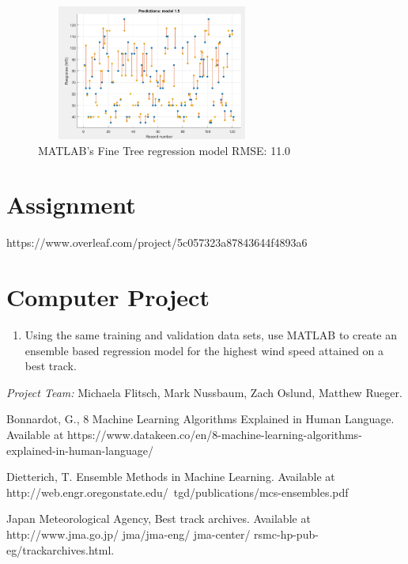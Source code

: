 \documentclass{SBCbookchapter}
\begin{document}
 \begin{figure}[!htpb]
 \centering
\includegraphics[width=3in,height=1.75in]{TyphoonCM2.png}
\caption{MATLAB's Fine Tree regression model RMSE: 11.0 }
\label{fig2}
\end{figure}

\section{Assignment}https://www.overleaf.com/project/5c057323a87843644f4893a6


\section{Computer Project}
\begin{enumerate}
\item Using the same training and validation data sets, use MATLAB to create 
an ensemble based regression model for the highest wind speed attained on a best track.
\end{enumerate}

\emph{Project Team:} Michaela Flitsch, Mark Nussbaum, Zach Oslund, Matthew Rueger.

\newpage
 \begin{thebibliography}{9}

   {Bonnardot, G.}, 8 Machine Learning Algorithms Explained in Human Language. Available at https://www.datakeen.co/en/8-machine-learning-algorithms-explained-in-human-language/
 
  {Dietterich, T.} Ensemble Methods in Machine Learning.  Available at http://web.engr.oregonstate.edu/~tgd/publications/mcs-ensembles.pdf
 
 {Japan Meteorological Agency},  Best track archives. Available at  http://www.jma.go.jp/ jma/jma-eng/ jma-center/ rsmc-hp-pub-eg/trackarchives.html.

\end{thebibliography}
\end{document}
